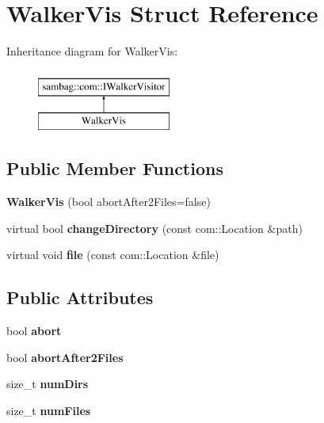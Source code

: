 \hypertarget{struct_walker_vis}{
\section{WalkerVis Struct Reference}
\label{struct_walker_vis}
}
Inheritance diagram for WalkerVis:\begin{figure}[H]
\begin{center}
\leavevmode
\includegraphics[height=2.000000cm]{struct_walker_vis}
\end{center}
\end{figure}
\subsection*{Public Member Functions}
\begin{DoxyCompactItemize}
\item 
\hypertarget{struct_walker_vis_affa19f4224fbcf2506300f996c8803ed}{
{\bfseries WalkerVis} (bool abortAfter2Files=false)}
\label{struct_walker_vis_affa19f4224fbcf2506300f996c8803ed}

\item 
\hypertarget{struct_walker_vis_a9dc5a3891b760c8a83b2c12a71394005}{
virtual bool {\bfseries changeDirectory} (const com::Location \&path)}
\label{struct_walker_vis_a9dc5a3891b760c8a83b2c12a71394005}

\item 
\hypertarget{struct_walker_vis_aabd2cfafa43384370c58532567a9ac81}{
virtual void {\bfseries file} (const com::Location \&file)}
\label{struct_walker_vis_aabd2cfafa43384370c58532567a9ac81}

\end{DoxyCompactItemize}
\subsection*{Public Attributes}
\begin{DoxyCompactItemize}
\item 
\hypertarget{struct_walker_vis_af10eed4964919114a5ef196547f25be7}{
bool {\bfseries abort}}
\label{struct_walker_vis_af10eed4964919114a5ef196547f25be7}

\item 
\hypertarget{struct_walker_vis_aec0dbb5441e122ec37ffc13e2b11a8c6}{
bool {\bfseries abortAfter2Files}}
\label{struct_walker_vis_aec0dbb5441e122ec37ffc13e2b11a8c6}

\item 
\hypertarget{struct_walker_vis_a4d74aa7568d227322ff240332ff8d07c}{
size\_\-t {\bfseries numDirs}}
\label{struct_walker_vis_a4d74aa7568d227322ff240332ff8d07c}

\item 
\hypertarget{struct_walker_vis_a17f8388f10c0fa59120f982b335a2ff8}{
size\_\-t {\bfseries numFiles}}
\label{struct_walker_vis_a17f8388f10c0fa59120f982b335a2ff8}

\end{DoxyCompactItemize}


